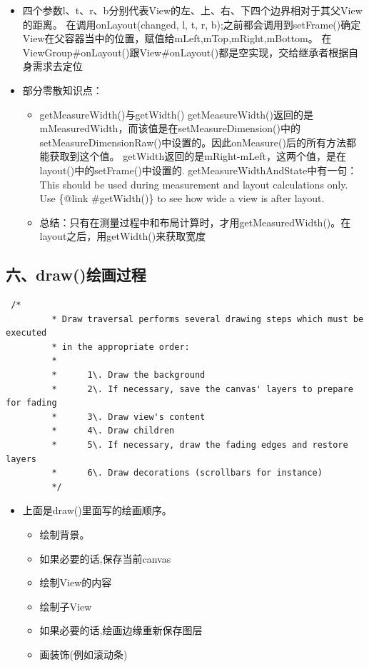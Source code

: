 \documentclass[9pt, b5paper]{article}
\begin{document}
\begin{itemize}
\item 四个参数l、t、r、b分别代表View的左、上、右、下四个边界相对于其父View的距离。 在调用onLayout(changed, l, t, r, b);之前都会调用到setFrame()确定View在父容器当中的位置，赋值给mLeft,mTop,mRight,mBottom。 在ViewGroup\#onLayout()跟View\#onLayout()都是空实现，交给继承者根据自身需求去定位
\item 部分零散知识点：
\begin{itemize}
\item getMeasureWidth()与getWidth() getMeasureWidth()返回的是mMeasuredWidth，而该值是在setMeasureDimension()中的setMeasureDimensionRaw()中设置的。因此onMeasure()后的所有方法都能获取到这个值。 getWidth返回的是mRight-mLeft，这两个值，是在layout()中的setFrame()中设置的. getMeasureWidthAndState中有一句： This should be used during measurement and layout calculations only. Use \{@link \#getWidth()\} to see how wide a view is after layout.
\item 总结：只有在测量过程中和布局计算时，才用getMeasuredWidth()。在layout之后，用getWidth()来获取宽度
\end{itemize}
\end{itemize}

\subsection{六、draw()绘画过程}
\label{sec-1-6}
\begin{verbatim}
 /*
         * Draw traversal performs several drawing steps which must be executed
         * in the appropriate order:
         *
         *      1\. Draw the background
         *      2\. If necessary, save the canvas' layers to prepare for fading
         *      3\. Draw view's content
         *      4\. Draw children
         *      5\. If necessary, draw the fading edges and restore layers
         *      6\. Draw decorations (scrollbars for instance)
         */
\end{verbatim}
\begin{itemize}
\item 上面是draw()里面写的绘画顺序。
\begin{itemize}
\item 绘制背景。
\item 如果必要的话,保存当前canvas
\item 绘制View的内容
\item 绘制子View
\item 如果必要的话,绘画边缘重新保存图层
\item 画装饰(例如滚动条)
\end{itemize}
\end{itemize}
\end{document}
